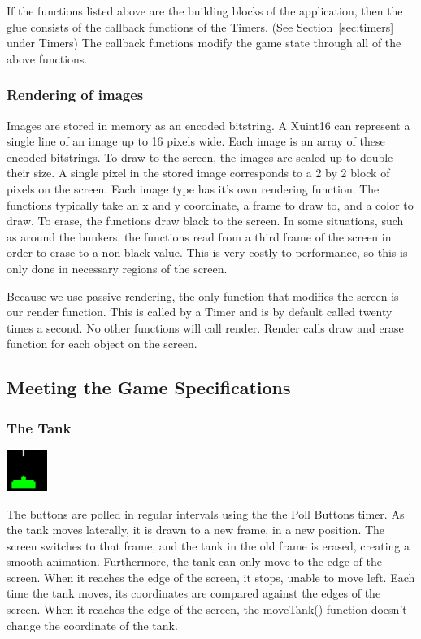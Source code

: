 \documentclass[11pt,letter,oneside]{report}
\begin{document}
If the functions listed above are the building blocks of the application, then the glue consists of the callback functions of the Timers.  (See Section~\ref{sec:timers} under Timers)  The callback functions modify the game state through all of the above functions.  

\subsubsection{Rendering of images}
Images are stored in memory as an encoded bitstring.  A Xuint16 can represent a single line of an image up to 16 pixels wide.  Each image is an array of these encoded bitstrings.  To draw to the screen, the images are scaled up to double their size.  A single pixel in the stored image corresponds to a 2 by 2 block of pixels on the screen. Each image type has it's own rendering function.  The functions typically take an x and y coordinate, a frame to draw to, and a color to draw.  To erase, the functions draw black to the screen.  In some situations, such as around the bunkers, the functions read from a third frame of the screen in order to erase to a non-black value.  This is very costly to performance, so this is only done in necessary regions of the screen.  

Because we use passive rendering, the only function that modifies the screen is our render function.  This is called by a Timer and is by default called twenty times a second.  No other functions will call render.  Render calls draw and erase function for each object on the screen.

\subsection{Meeting the Game Specifications}

\subsubsection{The Tank}
\includegraphics[]{tank.jpg}

The buttons are polled in regular intervals using the the Poll Buttons timer. As the tank moves laterally, it is drawn to a new frame, in a new position. The screen switches to that frame, and the tank in the old frame is erased, creating a smooth animation. Furthermore, the tank can only move to the edge of the screen. When it reaches the edge of the screen, it stops, unable to move left. Each time the tank moves, its coordinates are compared against the edges of the screen. When it reaches the edge of the screen, the moveTank() function doesn't change the coordinate of the tank.
\end{document}
